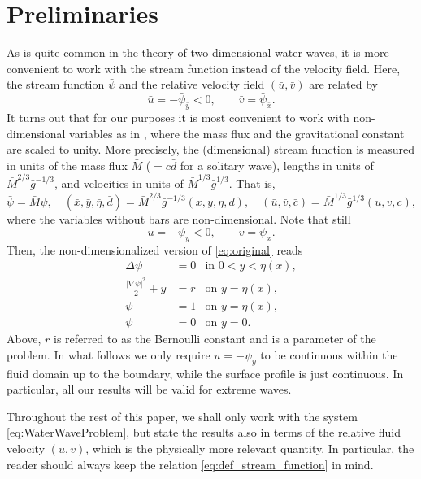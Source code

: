\documentclass{amsart}
\theoremstyle{definition}
\begin{document}
\section{Preliminaries}\label{sec:preliminaries}
As is quite common in the theory of two-dimensional water waves, it is more convenient to work with the stream function instead of the velocity field. Here, the stream function $\bar \psi$ and the relative velocity field $(\bar u,\bar v)$ are related by
\[\bar u=-\bar \psi_{\bar y}<0,\qquad \bar v=\bar \psi_{\bar x}.\]
It turns out that for our purposes it is most convenient to work with non-dimensional variables as in \cite{KeadyNorbury75}, where the mass flux and the gravitational constant are scaled to unity. More precisely, the (dimensional) stream function is measured in units of the mass flux $\bar M$ ($=\bar c\bar d$ for a solitary wave), lengths in units of $\bar M^{2/3}\bar g^{-1/3}$, and velocities in units of $\bar M^{1/3}\bar g^{1/3}$. That is,
\begin{equation}\label{eq:nondimensionalization}
	\bar\psi=\bar M\psi,\quad (\bar x,\bar y,\bar\eta,\bar d)=\bar M^{2/3}\bar g^{-1/3}(x,y,\eta,d),\quad(\bar u,\bar v,\bar c)=\bar M^{1/3}\bar g^{1/3}(u,v,c),
\end{equation}
where the variables without bars are non-dimensional. Note that still
\begin{equation}\label{eq:def_stream_function}
	u=-\psi_y<0,\qquad v=\psi_x.
\end{equation}
Then, the non-dimensionalized version of \eqref{eq:original} reads
\begin{subequations}\label{eq:WaterWaveProblem}
	\begin{align}
		\Delta\psi &= 0 & \text{in } 0 < y < \eta(x),\\
		\frac{|\nabla\psi|^2}{2} + y &= r & \text{on } y = \eta(x),\\
		\psi &= 1 & \text{on } y = \eta(x),\\
		\psi &= 0 & \text{on } y = 0.
	\end{align}
\end{subequations}
Above, $r$ is referred to as the Bernoulli constant and is a parameter of the problem. In what follows we only require $u=-\psi_y$ to be continuous within the fluid domain up to the boundary, while the surface profile is just continuous. In particular, all our results will be valid for extreme waves.

Throughout the rest of this paper, we shall only work with the system \eqref{eq:WaterWaveProblem}, but state the results also in terms of the relative fluid velocity $(u,v)$, which is the physically more relevant quantity. In particular, the reader should always keep the relation \eqref{eq:def_stream_function} in mind.
\end{document}
